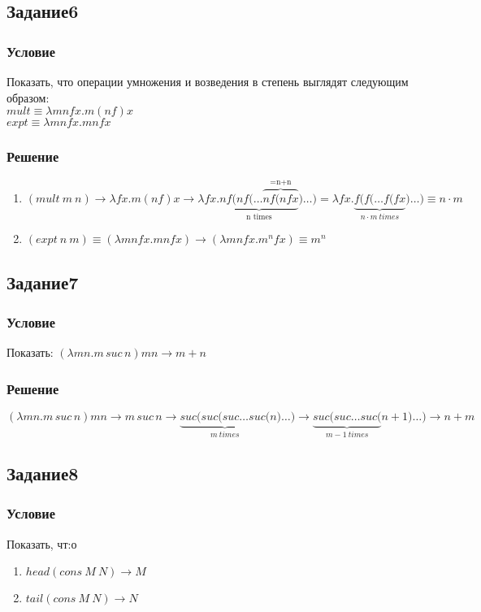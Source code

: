 \documentclass[10pt,a4paper]{article}
\begin{document}
\subsection*{Задание6}
\subsubsection*{Условие}
Показать, что операции умножения и возведения в степень выглядят
следующим образом:\\
$mult \equiv \lambda mnfx.m(nf)x$\\
$expt \equiv \lambda mnfx.mnfx$
\subsubsection*{Решение}
\begin{enumerate}
\item 
$(mult\ m\ n) \longrightarrow \lambda fx.m(nf)x \longrightarrow 
\lambda fx.\underbrace{nf(nf(\ldots \overbrace
{nf(nfx}^\text{=n+n}}_\text{n times})\ldots) = \lambda
fx.\underbrace{f(f(\ldots f(fx}_{n \cdot m\ times})\ldots) \equiv
n\cdot m$ 

\item
$
(expt\ n\ m) \equiv (\lambda mnfx.mnfx) \rightarrow 
(\lambda mnfx.m^nfx) \equiv m^n
$

\end{enumerate}

\subsection*{Задание7}
\subsubsection*{Условие}
Показать: $(\lambda mn.m\,suc\,n)mn \longrightarrow m+n $
\subsubsection*{Решение}
 $(\lambda mn.m\,suc\,n)mn \longrightarrow m\,suc\,n
\longrightarrow \underbrace{ suc(suc(suc \ldots suc(}_{m\ times}n)
\ldots ) \longrightarrow \underbrace{ suc(suc \ldots suc(}_{m-1\
  times}{n\!+\!1}) \ldots ) \longrightarrow n + m $
\subsection*{Задание8}
\subsubsection*{Условие}
Показать, чт:о
\begin{enumerate}
\item $head(cons\ M\ N) \longrightarrow M$ 
\item $tail(cons\ M\ N) \longrightarrow N$ 
\end{enumerate}
\end{document}
